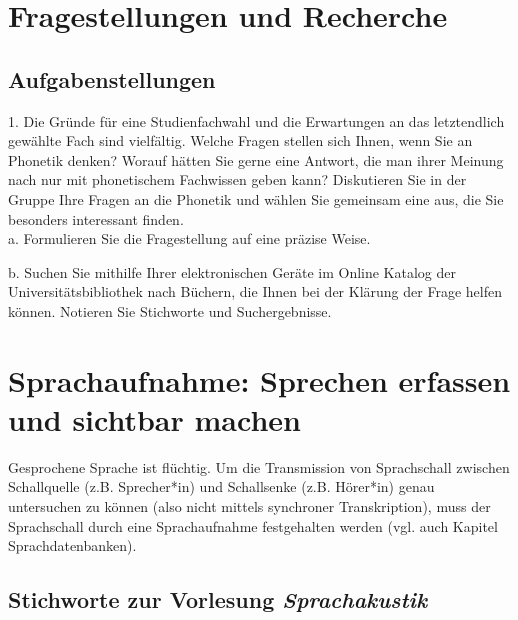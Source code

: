 \documentclass[11pt]{book}
\begin{document}
\vspace*{\fill} 






\chapter{Fragestellungen und Recherche}


\section{Aufgabenstellungen}

1.	Die Gründe für eine Studienfachwahl und die Erwartungen an das letztendlich gewählte Fach sind vielfältig.  Welche Fragen stellen sich Ihnen, wenn Sie an Phonetik denken? Worauf hätten Sie gerne eine Antwort, die man ihrer Meinung nach nur mit phonetischem Fachwissen geben kann? Diskutieren Sie in der Gruppe Ihre Fragen an die Phonetik und wählen Sie gemeinsam eine aus, die Sie besonders interessant finden.\\
\newpage
a.	Formulieren Sie die Fragestellung auf eine präzise Weise.

\vspace*{5cm}


b.	Suchen Sie mithilfe Ihrer elektronischen Geräte im Online Katalog der Universitätsbibliothek nach Büchern, die Ihnen bei der Klärung der Frage helfen können. Notieren Sie Stichworte und Suchergebnisse.
\vspace*{5cm}



\chapter{Sprachaufnahme: Sprechen erfassen und sichtbar machen} 

Gesprochene Sprache ist flüchtig. Um die Transmission von Sprachschall zwischen Schallquelle (z.\thinspace B. Sprecher*in) und Schallsenke (z.\thinspace B. Hörer*in) genau untersuchen zu können (also nicht mittels synchroner Transkription), muss der Sprachschall durch eine Sprachaufnahme festgehalten werden (vgl. auch Kapitel Sprachdatenbanken). 

\section{Stichworte zur Vorlesung \em{Sprachakustik}}
\end{document}
